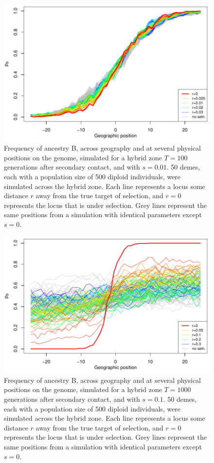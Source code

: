 \begin{figure}
\includegraphics{figs/alleleFrequencies_sim_s01_tau100_closely_linked.pdf}
\caption{
    Frequency of ancestry B,
    across geography and at several physical positions on the genome, simulated for a hybrid zone
     $T=100$ generations after secondary contact,
    and with $s=0.01$.
        50 demes, each with a population size of 500 diploid individuals, were simulated across the hybrid zone.
    Each line represents a locus some distance $r$ away from the true target of selection, 
    and $r=0$ represents the locus that is under selection. Grey lines represent the same positions from a simulation with
    identical parameters except $s=0$.
}\label{alleleFreq_tau100_weaker_s}
\end{figure}

\begin{figure}
\includegraphics{figs/alleleFrequencies_sim_s1_tau1000.pdf}
\caption{
    Frequency of ancestry B,
    across geography and at several physical positions on the genome, simulated for a hybrid zone
     $T=1000$ generations after secondary contact,
    and with $s=0.1$.
        50 demes, each with a population size of 500 diploid individuals, were simulated across the hybrid zone.
    Each line represents a locus some distance $r$ away from the true target of selection, 
    and $r=0$ represents the locus that is under selection. Grey lines represent the same positions from a simulation with
    identical parameters except $s=0$.
 }\label{alleleFreq_tau1000}
\end{figure}


